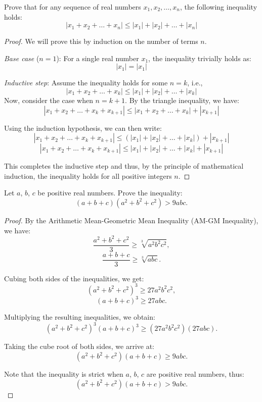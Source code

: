 \begin{exercise}
    Prove that for any sequence of real numbers \( x_1, x_2, \ldots, x_n \), the following inequality holds:
\[ \left|x_1 + x_2 + \ldots + x_n\right| \leq \left|x_1\right| + \left|x_2\right| + \ldots + \left|x_n\right| \]
\end{exercise}
\begin{proof}
    We will prove this by induction on the number of terms \( n \).

\textit{Base case} (\( n = 1 \)):
For a single real number \( x_1 \), the inequality trivially holds as:
\[ \left|x_1\right| = \left|x_1\right| \]

\textit{Inductive step}:
Assume the inequality holds for some \( n = k \), i.e.,
\[ \left|x_1 + x_2 + \ldots + x_k\right| \leq \left|x_1\right| + \left|x_2\right| + \ldots + \left|x_k\right| \]
Now, consider the case when \( n = k + 1 \). By the triangle inequality, we have:
\[ \left|x_1 + x_2 + \ldots + x_k + x_{k+1}\right| \leq \left|x_1 + x_2 + \ldots + x_k\right| + \left|x_{k+1}\right| \]

Using the induction hypothesis, we can then write:
\[ \left|x_1 + x_2 + \ldots + x_k + x_{k+1}\right| \leq \left(\left|x_1\right| + \left|x_2\right| + \ldots + \left|x_k\right|\right) + \left|x_{k+1}\right| \]
\[ \left|x_1 + x_2 + \ldots + x_k + x_{k+1}\right| \leq \left|x_1\right| + \left|x_2\right| + \ldots + \left|x_k\right| + \left|x_{k+1}\right| \]

This completes the inductive step and thus, by the principle of mathematical induction, the inequality holds for all positive integers \( n \).
\end{proof}

\begin{exercise}
    Let \(a\), \(b\), \(c\) be positive real numbers. Prove the inequality:
\[ (a+b+c)(a^2+b^2+c^2) > 9abc. \]
\end{exercise}
\begin{proof}
    By the Arithmetic Mean-Geometric Mean Inequality (AM-GM Inequality), we have:
\[ \frac{a^2+b^2+c^2}{3} \geq \sqrt[3]{a^2b^2c^2}, \]
\[ \frac{a+b+c}{3} \geq \sqrt[3]{abc}. \]

Cubing both sides of the inequalities, we get:
\[ (a^2+b^2+c^2)^3 \geq 27a^2b^2c^2, \]
\[ (a+b+c)^3 \geq 27abc. \]

Multiplying the resulting inequalities, we obtain:
\[ (a^2+b^2+c^2)^3(a+b+c)^3 \geq (27a^2b^2c^2)(27abc). \]

Taking the cube root of both sides, we arrive at:
\[ (a^2+b^2+c^2)(a+b+c) \geq 9abc. \]

Note that the inequality is strict when \(a\), \(b\), \(c\) are positive real numbers, thus:
\[ (a^2+b^2+c^2)(a+b+c) > 9abc. \]
\end{proof}

